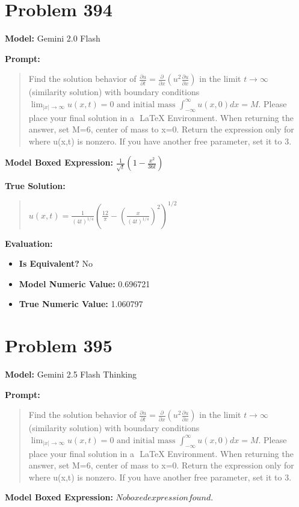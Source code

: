 \documentclass{article}
\begin{document}
{\section*{Problem 394}
\textbf{Model:} Gemini 2.0 Flash

\textbf{Prompt:}
\begin{quote}
Find the solution behavior of $\frac{\partial u}{\partial t} = \frac{\partial}{\partial x} \left( u^2 \frac{\partial u}{\partial x} \right)$ in the limit $t \to \infty$ (similarity solution) with boundary conditions $\lim_{|x| \to \infty} u(x,t) = 0 \text{ and initial mass } \int_{-\infty}^{\infty} u(x,0) dx = M$. Please place your final solution in a $\boxed{}$ LaTeX Environment. When returning the answer, set M=6, center of mass to x=0. Return the expression only for where u(x,t) is nonzero. If you have another free parameter, set it to 3.
\end{quote}
\textbf{Model Boxed Expression:} $\frac{1}{\sqrt{t}} \left(1 - \frac{x^2}{36t}\right)$

\textbf{True Solution:}
\begin{quote}
$u(x,t) = \frac{1}{(4t)^{1/4}} ( \frac{12}{\pi} - (\frac{x}{(4t)^{1/4}})^2 )^{1/2}$
\end{quote}

\textbf{Evaluation:}
\begin{itemize}
\item \textbf{Is Equivalent?} No
\item \textbf{Model Numeric Value:} 0.696721
\item \textbf{True Numeric Value:} 1.060797
\end{itemize}
\vspace{1cm}
\section*{Problem 395}
\textbf{Model:} Gemini 2.5 Flash Thinking

\textbf{Prompt:}
\begin{quote}
Find the solution behavior of $\frac{\partial u}{\partial t} = \frac{\partial}{\partial x} \left( u^2 \frac{\partial u}{\partial x} \right)$ in the limit $t \to \infty$ (similarity solution) with boundary conditions $\lim_{|x| \to \infty} u(x,t) = 0 \text{ and initial mass } \int_{-\infty}^{\infty} u(x,0) dx = M$. Please place your final solution in a $\boxed{}$ LaTeX Environment. When returning the answer, set M=6, center of mass to x=0. Return the expression only for where u(x,t) is nonzero. If you have another free parameter, set it to 3.
\end{quote}
\textbf{Model Boxed Expression:} $No boxed expression found.$

}
\end{document}

